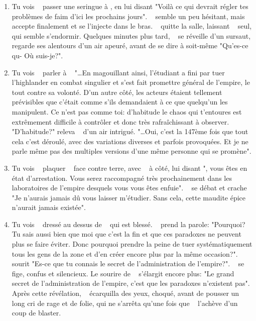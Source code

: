 {\begin{enumerate}
		\item Tu vois \nmPlayerI ~ passer une seringue à \nmPlayerIII, en lui disant "Voilà ce qui devrait régler tes problèmes de faim d'ici les prochains jours". \nmPlayerIII ~ semble un peu hésitant, mais accepte finalement et se l'injecte dans le bras. \nmPlayerI ~ quitte la salle, laissant \nmPlayerIII ~ seul, qui semble s'endormir. Quelques minutes plus tard, \nmPlayerIII ~ se réveille d'un sursaut, regarde ses alentours d'un air apeuré, avant de se dire à soit-même "Qu'es-ce qu- Où suis-je?".
		
		\item Tu vois \nmPlayerIV ~ parler à \nmPlayerXI ~ "\dots En magouillant ainsi, l'étudiant a fini par tuer l'highlander en combat singulier et s'est fait promettre général de l'empire, le tout contre sa volonté. D'un autre côté, les acteurs étaient tellement prévisibles que c'était comme s'ils demandaient à ce que quelqu'un les manipulent. Ce n'est pas comme toi: d'habitude le chaos qui t'entoures est extrêmement difficile à contrôler et donc très rafraîchissant à observer. "D'habitude?" releva \nmPlayerXI ~ d'un air intrigué. "\dots Oui, c'est la 147ème fois que tout cela c'est déroulé, avec des variations diverses et parfois provoquées. Et je ne parle même pas des multiples versions d'une même personne qui se promène".
		
		
		\item Tu vois \nmPlayerVII ~ plaquer \nmPlayerIX ~ face contre terre, avec \nmPlayerXII ~ à côté, lui disant "\nmPlayerIX, vous êtes en état d'arrestation. Vous serez raccompagné très prochainement dans les laboratoires de l'empire desquels vous vous êtes enfuie". \nmPlayerIX ~ se débat et crache "Je n'aurais jamais dû vous laisser m'étudier. Sans cela, cette maudite épice n'aurait jamais existée".
		
		\item Tu vois \nmPlayerXII ~ dressé au dessus de \nmPlayerVII ~ qui est blessé. \nmPlayerVII ~ prend la parole: "Pourquoi? Tu sais aussi bien que moi que c'est la fin et que ces paradoxes ne peuvent plus se faire éviter. Donc pourquoi prendre la peine de tuer systématiquement tous les gens de la zone et d'en créer encore plus par la même occasion?". \nmPlayerXII ~ sourit "Es-ce que tu connais le secret de l'administration de l'empire?". \nmPlayerVII ~ se fige, confus et silencieux.	Le sourire de \nmPlayerXII ~ s'élargit encore plus: "Le grand secret de l'administration de l'empire, c'est que les paradoxes n'existent pas". Après cette révélation, \nmPlayerVII ~ écarquilla des yeux, choqué, avant de pousser un long cri de rage et de folie, qui ne s'arrêta qu'une fois que \nmPlayerXII ~ l'achève d'un coup de blaster.
		

\end{enumerate}}
